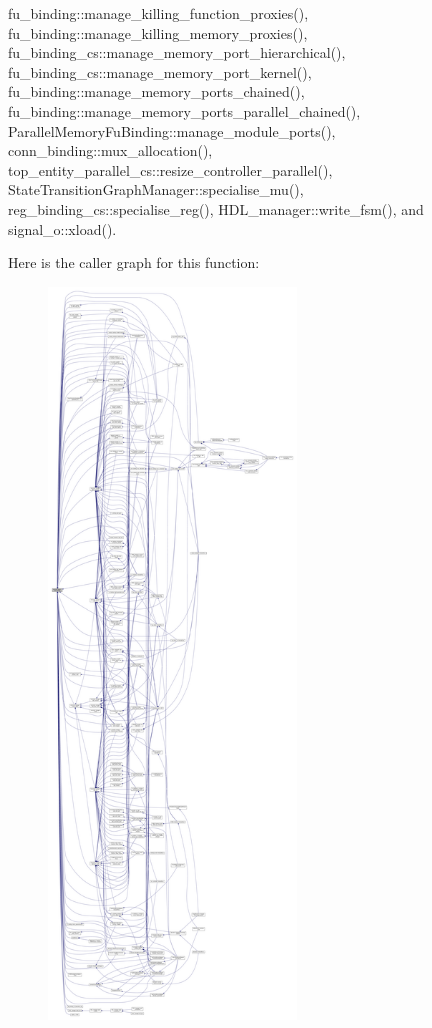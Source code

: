 fu\+\_\+binding\+::manage\+\_\+killing\+\_\+function\+\_\+proxies(), fu\+\_\+binding\+::manage\+\_\+killing\+\_\+memory\+\_\+proxies(), fu\+\_\+binding\+\_\+cs\+::manage\+\_\+memory\+\_\+port\+\_\+hierarchical(), fu\+\_\+binding\+\_\+cs\+::manage\+\_\+memory\+\_\+port\+\_\+kernel(), fu\+\_\+binding\+::manage\+\_\+memory\+\_\+ports\+\_\+chained(), fu\+\_\+binding\+::manage\+\_\+memory\+\_\+ports\+\_\+parallel\+\_\+chained(), Parallel\+Memory\+Fu\+Binding\+::manage\+\_\+module\+\_\+ports(), conn\+\_\+binding\+::mux\+\_\+allocation(), top\+\_\+entity\+\_\+parallel\+\_\+cs\+::resize\+\_\+controller\+\_\+parallel(), State\+Transition\+Graph\+Manager\+::specialise\+\_\+mu(), reg\+\_\+binding\+\_\+cs\+::specialise\+\_\+reg(), H\+D\+L\+\_\+manager\+::write\+\_\+fsm(), and signal\+\_\+o\+::xload().

Here is the caller graph for this function\+:
\nopagebreak
\begin{figure}[H]
\begin{center}
\leavevmode
\includegraphics[height=550pt]{d8/da3/classstructural__object_a3a8b2d38c2b5666700053a72868bb6b2_icgraph}
\end{center}
\end{figure}
\mbox{\label{classstructural__object_ad191c9ede27d8f1aab98cbf72343ba03}} 
